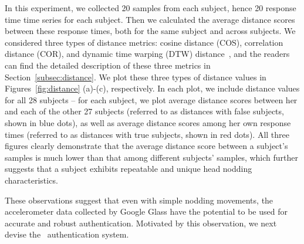 In this experiment, we collected 20 samples from each subject, hence 20 response time time series for each subject. Then we calculated the average distance scores between these response times, both for the same subject and across subjects. We considered three types of distance metrics: cosine distance (COS), correlation distance (COR), and dynamic time warping (DTW) distance~\cite{dtw}, and the readers can find the detailed description of these three metrics in Section~\ref{subsec:distance}. We plot these three types of distance values in Figures~\ref{fig:distance} (a)-(c), respectively. In each plot, we include distance values for all 28 subjects -- for each subject, we plot average distance scores between her and each of the other 27 subjects (referred to as distances with false subjects, shown in blue dots), as well as average distance scores among her own response times (referred to as distances with true subjects, shown in red dots). All three figures clearly demonstrate that the average distance score between a subject's samples is much lower than that among different subjects' samples, which further suggests that a subject exhibits repeatable and unique head nodding characteristics.


These observations suggest that even with simple nodding movements, the accelerometer data collected by Google Glass have the potential to be used for accurate and robust authentication. Motivated by this observation, we next devise the \systemname~authentication system.
